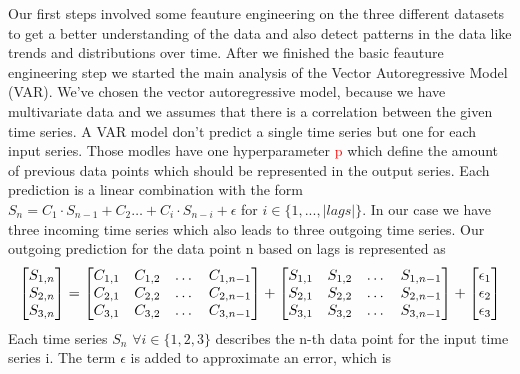 \documentclass{article}
\theoremstyle{plain}
\theoremstyle{definition}
\theoremstyle{remark}
\begin{document}
Our first steps involved some feauture engineering on the three different datasets to get a better understanding of the data and also detect patterns in the data like trends and distributions over time.
After we finished the basic feauture engineering step we started the main analysis of the Vector Autoregressive Model (VAR). 
We've chosen the vector autoregressive model, because we have multivariate data and we assumes that there is a correlation between the given time series.
A VAR model don't predict a single time series but one for each input series. Those modles have one hyperparameter \textcolor{red}{p} which define the amount 
of previous data points which should be represented in the output series. Each prediction is a linear combination with the form  $S_n = C_{1} \cdot S_{n-1}+ C_{2} \dots+ C_i \cdot  S_{n-i} + \epsilon$ for
$i \in \{1,...,|lags|\}$. In our case we have three incoming time series which also leads to three outgoing time series. Our outgoing prediction for the data point n based on lags 
is represented as
\begin{equation*}
    \resizebox{\linewidth}{!}{%
        $\begin{bmatrix}
            S_{1,n}\\
            S_{2,n}\\
            S_{3,n}
        \end{bmatrix} = 
        \begin{bmatrix}
            C_{1,1} & C_{1,2} & \dots &C_{1,n-1}\\
            C_{2,1} & C_{2,2} &\dots & C_{2,n-1}\\
            C_{3,1} & C_{3,2} &\dots &C_{3,n-1}\\
        \end{bmatrix} + 
        \begin{bmatrix}
            S_{1,1} & S_{1,2} & \dots & S_{1,n-1}\\
            S_{2,1} & S_{2,2} & \dots & S_{2,n-1}\\
            S_{3,1} & S_{3,2} & \dots & S_{3,n-1}\\
        \end{bmatrix}+
        \begin{bmatrix}
            \epsilon_{1}\\
            \epsilon_{2}\\
            \epsilon_{3}
        \end{bmatrix}$%
    }
    \end{equation*}
Each time series $S_n$ $\forall i \in \{1,2,3\}$ describes the n-th data point for the input time series i. The term $\epsilon$ is added to approximate an error, which is 
\end{document}
